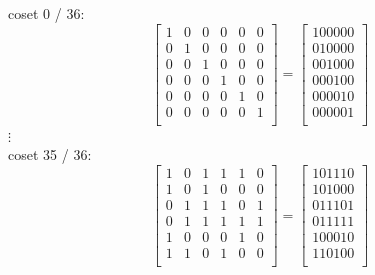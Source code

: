 coset 0 / 36:
$$
\left[
\begin{array}{*{6}{r}}
1 & 0 & 0 & 0 & 0 & 0\\
0 & 1 & 0 & 0 & 0 & 0\\
0 & 0 & 1 & 0 & 0 & 0\\
0 & 0 & 0 & 1 & 0 & 0\\
0 & 0 & 0 & 0 & 1 & 0\\
0 & 0 & 0 & 0 & 0 & 1\\
\end{array}
\right]
=
\left[
\begin{array}{c}
100000\\
010000\\
001000\\
000100\\
000010\\
000001\\
\end{array}
\right]
$$
$\vdots$\\
coset 35 / 36:
$$
\left[
\begin{array}{*{6}{r}}
1 & 0 & 1 & 1 & 1 & 0\\
1 & 0 & 1 & 0 & 0 & 0\\
0 & 1 & 1 & 1 & 0 & 1\\
0 & 1 & 1 & 1 & 1 & 1\\
1 & 0 & 0 & 0 & 1 & 0\\
1 & 1 & 0 & 1 & 0 & 0\\
\end{array}
\right]
=
\left[
\begin{array}{c}
101110\\
101000\\
011101\\
011111\\
100010\\
110100\\
\end{array}
\right]
$$
